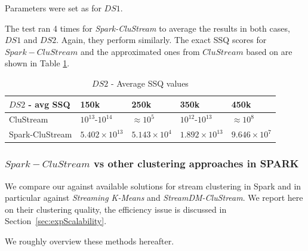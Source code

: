 Parameters were set as for $DS1$.

The test ran 4 times for \textit{Spark-CluStream} to average the results in both cases, $DS1$ and $DS2$. 
Again, they perform similarly. The exact SSQ scores for $Spark-CluStream$ and the approximated ones from $CluStream$ based on \cite{clustreamOrig} are shown in Table \ref{tab:DS2quality}.

\begin{table}[t]
\centering
\begin{tabular}{|l|l|l|l|l|}\hline
\textbf{$DS2$ - avg SSQ} & \textbf{150k} & \textbf{250k} & \textbf{350k} & \textbf{450k}\\\hline
CluStream & $10^{13}$-$10^{14}$ & $\approx 10^{5}$ & $10^{12}$-$10^{13}$ & $\approx 10^{8}$\\\hline
Spark-CluStream & $5.402\times10^{13}$ & $5.143\times10^{4}$ & $1.892\times10^{13}$ & $9.646\times10^7$\\\hline
  \end{tabular}
  \caption{$DS2$ - Average SSQ values}
  \label{tab:DS2quality}
\end{table}

\subsubsection{$Spark-CluStream$ vs other clustering approaches in SPARK}
\label{sec:expQuality-vs-SPARK}
We compare our \our  against available solutions for stream clustering in Spark and in particular against \textit{Streaming K-Means} and \textit{StreamDM-CluStream}.
We report here on their clustering quality, the efficiency issue is discussed in Section~\ref{sec:expScalability}.

We roughly overview these methods hereafter.

